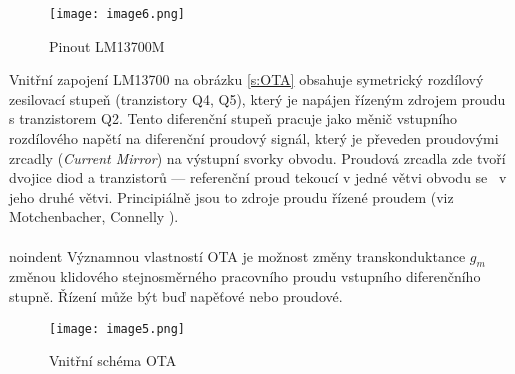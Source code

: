 \begin{figure}[h]
\centering
\texttt{[image: image6.png]}
\caption[Pinout LM13700M]{Pinout LM13700M \cite{20} \label{s:PIN}}
\end{figure}
\noindent Vnitřní zapojení LM13700 na obrázku \ref{s:OTA} obsahuje symetrický rozdílový zesilovací stupeň (tranzistory Q4, Q5), který je napájen řízeným zdrojem proudu s tranzistorem Q2. Tento diferenční stupeň pracuje jako měnič vstupního rozdílového napětí na diferenční proudový signál, který je převeden proudovými zrcadly (\textit{Current Mirror}) na výstupní svorky obvodu. Proudová zrcadla zde tvoří dvojice diod a tranzistorů --- referenční proud tekoucí v jedné větvi obvodu se  ~v jeho druhé větvi. Principiálně jsou to zdroje proudu řízené proudem (viz Motchenbacher, Connelly \cite{21}).
\\
\\noindent Významnou vlastností OTA je možnost změny transkonduktance $g_m$ změnou klidového stejnosměrného pracovního proudu vstupního diferenčního stupně. Řízení může být buď napěťové nebo proudové.
\begin{figure}[h]
\centering
\texttt{[image: image5.png]}
\caption[Vnitřní schéma OTA]{Vnitřní schéma OTA \cite{20}\label{sec:OTA}}
\end{figure}